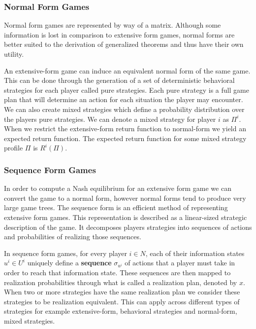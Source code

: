 \subsubsection{Normal Form Games}
Normal form games are represented by way of a matrix.
Although some information is lost in comparison to extensive form games, normal forms are
better suited to the derivation of generalized theorems\citep{kuhn2016extensive} and thus have their own utility.

An extensive-form game can induce an equivalent normal form of the same game.
This can be done through the generation of a set of deterministic behavioral strategies for each player
called pure strategies.
Each pure strategy is a full game plan that will determine an action for each situation the player may encounter.
We can also create mixed strategies which define a probability distribution over the players pure strategies.
We can denote a mixed strategy for player $i$ as $\Pi^i$.
When we restrict the extensive-form return function to normal-form we yield an expected return function.
The expected return function for some mixed strategy profile $\Pi$ is $R^i(\Pi)$\citep{heinrich2017reinforcement}.

\subsubsection{Sequence Form Games}
In order to compute a Nash equilibrium for an extensive form game we can convert the game to a normal form,
however normal forms tend to produce very large game trees.
The sequence form is an efficient method of representing extensive form games\citep{koller1996efficient}.
This representation is described as a linear-sized strategic description of the game.
It decomposes players strategies into sequences of actions and probabilities of realizing those sequences.

In sequence form games, for every player $i\in N$, each of their information states $u^i\in U^i$
uniquely define a \textbf{sequence} $\sigma_{u^i}$ of actions that a player must take in order to reach
that information state.
These sequences are then mapped to realization probabilities through what is called a realization plan,
denoted by $x$.
When two or more strategies have the same realization plan we consider these strategies to be
realization equivalent\citep{von1996efficient}.
This can apply across different types of strategies for example extensive-form, behavioral strategies
and normal-form, mixed strategies\citep{kuhn2016extensive}.

